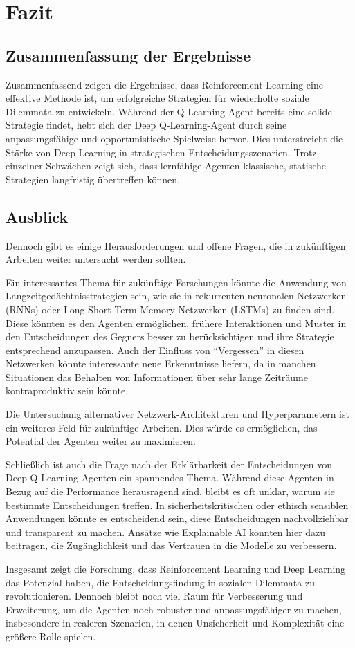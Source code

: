 \chapter{Fazit}
\section{Zusammenfassung der Ergebnisse}
Zusammenfassend zeigen die Ergebnisse, dass Reinforcement Learning eine effektive Methode ist, um erfolgreiche Strategien für wiederholte 
soziale Dilemmata zu entwickeln. Während der Q-Learning-Agent bereits eine solide Strategie findet, hebt sich der Deep Q-Learning-Agent 
durch seine anpassungsfähige und opportunistische Spielweise hervor. Dies unterstreicht die Stärke von Deep Learning in strategischen 
Entscheidungsszenarien. Trotz einzelner Schwächen zeigt sich, dass lernfähige Agenten klassische, statische Strategien langfristig übertreffen können.

\section{Ausblick}
Dennoch gibt es einige Herausforderungen und 
offene Fragen, die in zukünftigen Arbeiten weiter untersucht werden sollten.

Ein interessantes Thema für zukünftige Forschungen könnte die Anwendung von Langzeitgedächtnisstrategien sein, 
wie sie in rekurrenten neuronalen Netzwerken (RNNs) oder Long Short-Term Memory-Netzwerken (LSTMs) zu finden sind. 
Diese könnten es den Agenten ermöglichen, frühere Interaktionen und Muster in den Entscheidungen des Gegners besser zu berücksichtigen 
und ihre Strategie entsprechend anzupassen. Auch der Einfluss von ``Vergessen'' in diesen Netzwerken könnte interessante neue 
Erkenntnisse liefern, da in manchen Situationen das Behalten von Informationen über sehr lange Zeiträume kontraproduktiv sein könnte.

Die Untersuchung alternativer Netzwerk-Architekturen und Hyperparametern ist ein weiteres Feld für zukünftige Arbeiten. 
Dies würde es ermöglichen, das Potential der Agenten weiter zu maximieren.

Schließlich ist auch die Frage nach der Erklärbarkeit der Entscheidungen von Deep Q-Learning-Agenten ein spannendes Thema. 
Während diese Agenten in Bezug auf die Performance herausragend sind, bleibt es oft unklar, warum sie bestimmte Entscheidungen treffen. 
In sicherheitskritischen oder ethisch sensiblen Anwendungen könnte es entscheidend sein, diese Entscheidungen nachvollziehbar 
und transparent zu machen. Ansätze wie Explainable AI könnten hier dazu beitragen, die Zugänglichkeit und das 
Vertrauen in die Modelle zu verbessern.

Insgesamt zeigt die Forschung, dass Reinforcement Learning und Deep Learning das Potenzial haben, die Entscheidungsfindung in sozialen Dilemmata zu revolutionieren. Dennoch bleibt noch viel Raum für Verbesserung und Erweiterung, um die Agenten noch robuster und anpassungsfähiger zu machen, insbesondere in realeren Szenarien, in denen Unsicherheit und Komplexität eine größere Rolle spielen.
